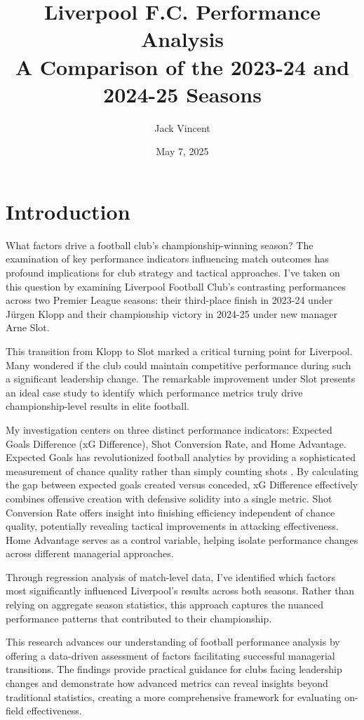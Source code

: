 \documentclass[12pt]{article}
\title{Liverpool F.C. Performance Analysis\\
A Comparison of the 2023-24 and 2024-25 Seasons}
\author{Jack Vincent}
\date{May 7, 2025}
\begin{document}
\maketitle

\section*{Introduction}

What factors drive a football club's championship-winning season? The examination of key performance indicators influencing match outcomes has profound implications for club strategy and tactical approaches. I've taken on this question by examining Liverpool Football Club's contrasting performances across two Premier League seasons: their third-place finish in 2023-24 under Jürgen Klopp and their championship victory in 2024-25 under new manager Arne Slot.

This transition from Klopp to Slot marked a critical turning point for Liverpool. Many wondered if the club could maintain competitive performance during such a significant leadership change. The remarkable improvement under Slot presents an ideal case study to identify which performance metrics truly drive championship-level results in elite football.

My investigation centers on three distinct performance indicators: Expected Goals Difference (xG Difference), Shot Conversion Rate, and Home Advantage. Expected Goals has revolutionized football analytics by providing a sophisticated measurement of chance quality rather than simply counting shots \citep{cavus2022}. By calculating the gap between expected goals created versus conceded, xG Difference effectively combines offensive creation with defensive solidity into a single metric. Shot Conversion Rate offers insight into finishing efficiency independent of chance quality, potentially revealing tactical improvements in attacking effectiveness. Home Advantage serves as a control variable, helping isolate performance changes across different managerial approaches.

Through regression analysis of match-level data, I've identified which factors most significantly influenced Liverpool's results across both seasons. Rather than relying on aggregate season statistics, this approach captures the nuanced performance patterns that contributed to their championship.

This research advances our understanding of football performance analysis by offering a data-driven assessment of factors facilitating successful managerial transitions. The findings provide practical guidance for clubs facing leadership changes and demonstrate how advanced metrics can reveal insights beyond traditional statistics, creating a more comprehensive framework for evaluating on-field effectiveness.
\end{document}
